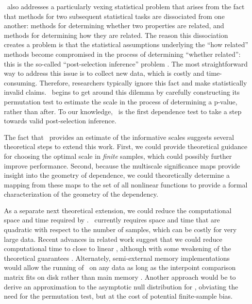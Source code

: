 \documentclass[11pt]{extarticle}
\begin{document}
\Mgc~also addresses a particularly vexing statistical problem that arises from the fact that methods for two subsequent statistical tasks are dissociated from one another: methods for determining whether two properties are related, and methods for determining how they are related.
The reason this dissociation creates a problem is that the statistical assumptions underlying the ``how related'' methods become compromised in the process of determining ``whether related'': this is the so-called ``post-selection inference'' problem \cite{berk2013valid}.
The most straightforward way to address this issue is to collect new data, which is costly and time-consuming. Therefore, researchers typically ignore this fact and make statistically invalid claims.
\Mgc~begins to get around this dilemma by carefully constructing its permutation test to estimate the scale in the process of determining a p-value, rather than after.
To our knowledge, \Mgc~is the first dependence test to take a step towards valid post-selection inference.

The fact that \Mgc~provides an estimate of the informative scales suggests several  theoretical steps to extend this work.
First, we could provide theoretical guidance for choosing the optimal scale in \emph{finite} samples, which could possibly further improve performance.  Second, because the multiscale significance maps provide insight into the geometry of dependence, we could theoretically determine a mapping from these maps to the set of all nonlinear functions to provide a formal characterization of the geometry of the dependency.

As a separate next theoretical extension, we could reduce the computational space and time required by \Mgc. \Mgc~currently requires space and time that are quadratic with respect to the number of samples, which can be costly for very large data.  Recent advances in related work suggest that we could reduce computational time to close to linear \cite{Huo2016}, although with some weakening of the theoretical guarantees \cite{zhang2017large}. Alternately, semi-external memory implementations would allow the running of \Mgc~on any data as long as the interpoint comparison matrix fits on disk rather than main memory \cite{Zheng2015,Zheng2016,Zheng2016c,Zheng2016b}. Another approach would be to derive an approximation to the asymptotic null distribution for \Mgc, obviating the need for the permutation test, but at the cost of potential finite-sample bias. %
\end{document}
